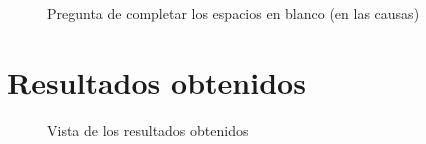 {\begin{figure}[H]
\centering
 \caption{Pregunta de completar los espacios en blanco (en las causas)}
 \label{fig:pregcaus} 
\end{figure}


\section{Resultados obtenidos}

\begin{figure}[H]
\centering
 \caption{Vista de los resultados obtenidos}
 \label{fig:notas} 
\end{figure}

}
